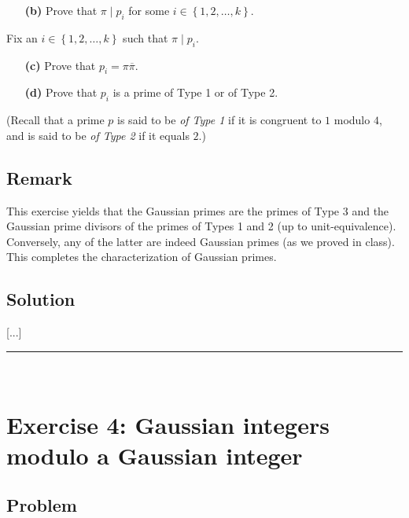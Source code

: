 \documentclass[paper=a4, fontsize=12pt]{scrartcl} %
\newcommand{\set}[1]{\left\{ #1 \right\}}
\newcommand{\horrule}[1]{\rule{\linewidth}{#1}} %
\theoremstyle{plainsl}
\theoremstyle{definition}
\theoremstyle{remark}
\begin{document}
\begin{enumerate}

\item[\textbf{(b)}]
Prove that $\pi \mid p_i$ for some $i \in \set{1, 2, \ldots, k}$.

\end{enumerate}

Fix an $i \in \set{1, 2, \ldots, k}$ such that $\pi \mid p_i$.

\begin{enumerate}

\item[\textbf{(c)}]
Prove that $p_i = \pi \overline{\pi}$.

\item[\textbf{(d)}]
Prove that $p_i$ is a prime of Type 1 or of Type 2.

\end{enumerate}

\noindent
(Recall that a prime $p$ is said to be \textit{of Type 1} if
it is congruent to $1$ modulo $4$,
and is said to be \textit{of Type 2} if it
equals $2$.)

\subsection{Remark}

This exercise yields that the Gaussian primes are the
primes of Type 3 and the Gaussian prime divisors of the
primes of Types 1 and 2 (up to unit-equivalence).
Conversely, any of the latter are indeed Gaussian primes
(as we proved in class).
This completes the characterization of Gaussian primes.

\subsection{Solution}

[...]

\horrule{0.3pt} \\[0.4cm]

\section{Exercise 4: Gaussian integers modulo a Gaussian integer}

\subsection{Problem}
\end{document}
